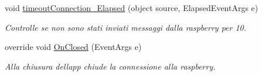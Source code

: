 \begin{DoxyCompactItemize}
\mbox{\label{classclient__app_1_1_main_window_ab9edbb0a6d6202faa6463079a8d75cf5}} 
void \mbox{\hyperlink{classclient__app_1_1_main_window_ab9edbb0a6d6202faa6463079a8d75cf5}{timeout\+Connection\+\_\+\+Elapsed}} (object source, Elapsed\+Event\+Args e)
\begin{DoxyCompactList}\small\item\em Controlle se non sono stati inviati messaggi dalla raspberry per 10. \end{DoxyCompactList}\item 
\mbox{\label{classclient__app_1_1_main_window_a0be8c9631369528d985da0a10bf76996}} 
override void \mbox{\hyperlink{classclient__app_1_1_main_window_a0be8c9631369528d985da0a10bf76996}{On\+Closed}} (Event\+Args e)
\begin{DoxyCompactList}\small\item\em Alla chiusura dell\textquotesingle{}app chiude la connessione alla raspberry. \end{DoxyCompactList}\end{DoxyCompactItemize}
